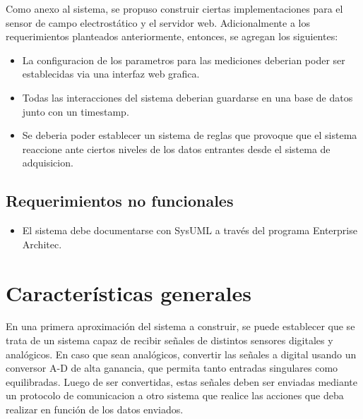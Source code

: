 Como anexo al sistema, se propuso construir ciertas implementaciones para el sensor de campo electrostático y el servidor web. Adicionalmente a los requerimientos planteados anteriormente, entonces, se agregan los siguientes:

\begin{itemize}
    \item La configuracion de los parametros para las mediciones deberian poder ser establecidas via una interfaz web grafica.
    \item Todas las interacciones del sistema deberian guardarse en una base de datos junto con un timestamp.
    \item Se deberia poder establecer un sistema de reglas que provoque que el sistema reaccione ante ciertos niveles de los datos entrantes desde el sistema de adquisicion.
\end{itemize}


\subsection{Requerimientos no funcionales} %
\label{sub:requerimientos_no_funcionales}

\begin{itemize}
	\item El sistema debe documentarse con SysUML a través del programa Enterprise Architec.
\end{itemize}



\section{Características generales} %
\label{sec:caracteristicas_generales}

En una primera aproximación del sistema a construir, se puede establecer que se trata de un sistema capaz de recibir señales de distintos sensores digitales y analógicos. En caso que sean analógicos, convertir las señales a digital usando un conversor A-D de alta ganancia, que permita tanto entradas singulares como equilibradas. Luego de ser convertidas, estas señales deben ser enviadas mediante un protocolo de comunicacion a otro sistema que realice las acciones que deba realizar en función de los datos enviados.

